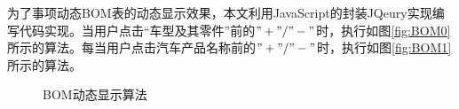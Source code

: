 为了事项动态BOM表的动态显示效果，本文利用JavaScript的封装JQeury实现编写代码实现。当用户点击``车型及其零件''前的$"+"/"-"$时，执行如图\ref{fig:BOM0}所示的算法。每当用户点击汽车产品名称前的$"+"/"-"$时，执行如图\ref{fig:BOM1}所示的算法。
\begin{figure}[H]
\centering
{}
	\quad
{}
\caption{BOM动态显示算法}
\label{fig:BOM}
\end{figure}

